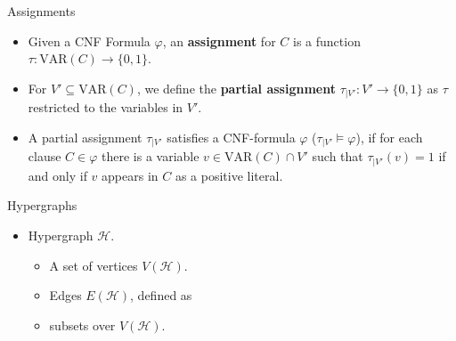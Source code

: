 \begin{frame}[t]{Assignments}
	\begin{itemize}[<+->]
		\item Given a CNF Formula $\varphi$, an \textbf{assignment} for $C$ is a function $\tau : \mathrm{VAR}(C) \rightarrow \{0, 1\}$.
		\item For $V' \subseteq \mathrm{VAR}(C)$, we define the \textbf{partial assignment} $\tau_{|V'} : V' \rightarrow \{0, 1\}$ as $\tau$ restricted to the variables in $V'$.
		\item A partial assignment $\tau_{|V'}$ satisfies a CNF-formula $\varphi$ ($\tau_{|V'} \models \varphi$), if for each clause $C \in \varphi$ there is a variable $v \in \mathrm{VAR}(C) \cap V'$ such that $\tau_{|V'}(v) = 1$ if and only if $v$ appears in $C$ as a positive literal.

	\end{itemize}
\end{frame}


\begin{frame}[t]{Hypergraphs}
	\begin{minipage}{.59\linewidth}
	\begin{itemize}
		\item Hypergraph $\mathcal{H}$.
			\begin{itemize}
				\item A set of vertices $V(\mathcal{H})$.
				\item Edges $E(\mathcal{H})$, defined as 
				\item[] subsets over $V(\mathcal{H})$.
			\end{itemize}




	\end{itemize}
\end{minipage}
\begin{minipage}{.39\linewidth}
\centering

\end{minipage}
\end{frame}

